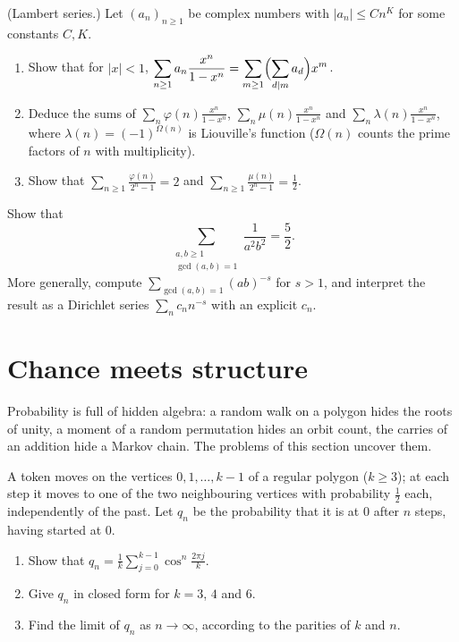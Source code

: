\begin{exercise}[$\star\star$]\label{pb:lambert}
(Lambert series.) Let $(a_n)_{n\ge1}$ be complex numbers with $|a_n|\le Cn^K$ for some constants $C,K$.
\begin{enumerate}[label=(\alph*)]
\item Show that for $|x|<1$, $\displaystyle\sum_{n\ge1}a_n\frac{x^n}{1-x^n}=\sum_{m\ge1}\Bigl(\sum_{d\mid m}a_d\Bigr)x^m$.
\item Deduce the sums of $\sum_n\varphi(n)\frac{x^n}{1-x^n}$, $\sum_n\mu(n)\frac{x^n}{1-x^n}$ and $\sum_n\lambda(n)\frac{x^n}{1-x^n}$,
where $\lambda(n)=(-1)^{\Omega(n)}$ is Liouville's function ($\Omega(n)$ counts the prime factors of $n$ with multiplicity).
\item Show that $\displaystyle\sum_{n\ge1}\frac{\varphi(n)}{2^n-1}=2$ and $\displaystyle\sum_{n\ge1}\frac{\mu(n)}{2^n-1}=\frac12$.
\end{enumerate}
\end{exercise}

\begin{exercise}[$\star\star$]\label{pb:coprime52}
Show that
\[
\sum_{\substack{a,b\ge1\\\gcd(a,b)=1}}\frac1{a^2b^2}=\frac52.
\]
More generally, compute $\sum_{\gcd(a,b)=1}(ab)^{-s}$ for $s>1$, and interpret the result as a Dirichlet series
$\sum_nc_nn^{-s}$ with an explicit $c_n$.
\end{exercise}

\section{Chance meets structure}

Probability is full of hidden algebra: a random walk on a polygon hides the roots of unity, a moment of a random permutation
hides an orbit count, the carries of an addition hide a Markov chain. The problems of this section uncover them.

\begin{exercise}[$\star$]\label{pb:cyclewalk}
A token moves on the vertices $0,1,\dots,k-1$ of a regular polygon ($k\ge3$); at each step it moves to one of the two
neighbouring vertices with probability $\frac12$ each, independently of the past. Let $q_n$ be the probability that it is at
$0$ after $n$ steps, having started at $0$.
\begin{enumerate}[label=(\alph*)]
\item Show that $q_n=\frac1k\sum_{j=0}^{k-1}\cos^n\frac{2\pi j}k$.
\item Give $q_n$ in closed form for $k=3$, $4$ and $6$.
\item Find the limit of $q_n$ as $n\to\infty$, according to the parities of $k$ and $n$.
\end{enumerate}
\end{exercise}


